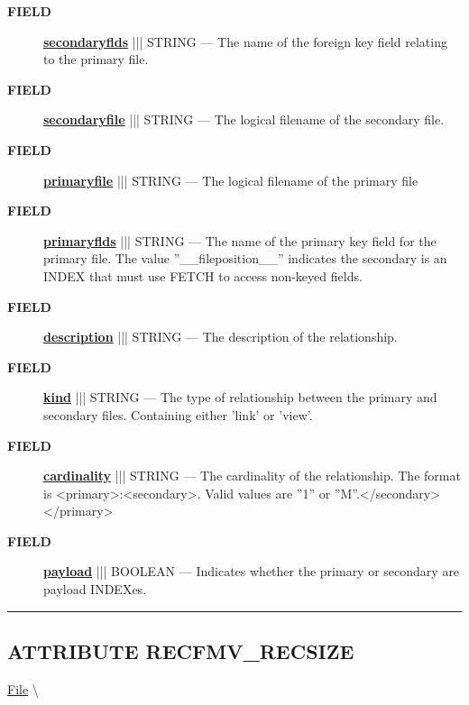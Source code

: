 \par
\begin{description}
\item [\colorbox{tagtype}{\color{white} \textbf{\textsf{FIELD}}}] \textbf{\underline{secondaryflds}} ||| STRING --- The name of the foreign key field relating to the primary file.
\item [\colorbox{tagtype}{\color{white} \textbf{\textsf{FIELD}}}] \textbf{\underline{secondaryfile}} ||| STRING --- The logical filename of the secondary file.
\item [\colorbox{tagtype}{\color{white} \textbf{\textsf{FIELD}}}] \textbf{\underline{primaryfile}} ||| STRING --- The logical filename of the primary file
\item [\colorbox{tagtype}{\color{white} \textbf{\textsf{FIELD}}}] \textbf{\underline{primaryflds}} ||| STRING --- The name of the primary key field for the primary file. The value ''\_\_fileposition\_\_'' indicates the secondary is an INDEX that must use FETCH to access non-keyed fields.
\item [\colorbox{tagtype}{\color{white} \textbf{\textsf{FIELD}}}] \textbf{\underline{description}} ||| STRING --- The description of the relationship.
\item [\colorbox{tagtype}{\color{white} \textbf{\textsf{FIELD}}}] \textbf{\underline{kind}} ||| STRING --- The type of relationship between the primary and secondary files. Containing either 'link' or 'view'.
\item [\colorbox{tagtype}{\color{white} \textbf{\textsf{FIELD}}}] \textbf{\underline{cardinality}} ||| STRING --- The cardinality of the relationship. The format is <primary>:<secondary>. Valid values are ''1'' or ''M''.</secondary></primary>
\item [\colorbox{tagtype}{\color{white} \textbf{\textsf{FIELD}}}] \textbf{\underline{payload}} ||| BOOLEAN --- Indicates whether the primary or secondary are payload INDEXes.
\end{description}





\rule{\linewidth}{0.5pt}
\subsection*{\textsf{\colorbox{headtoc}{\color{white} ATTRIBUTE}
RECFMV\_RECSIZE}}

\hypertarget{ecldoc:file.recfmv_recsize}{}
\hspace{0pt} \hyperlink{ecldoc:File}{File} \textbackslash 

